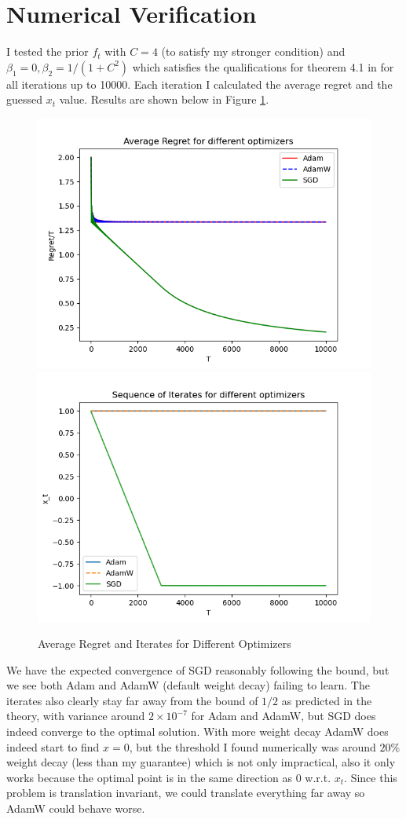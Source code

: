 \documentclass[landscape,twocolumn]{article}
\newcommand{\1}{\mathds{1}}
\begin{document}
\section{Numerical Verification}
I tested the prior \(f_t\) with \(C=4\) (to satisfy my stronger condition) and \(\beta_1=0,\beta_2 = 1/(1+C^2)\) which satisfies the qualifications for theorem 4.1 in \cite{kingma2017adam} for all iterations up to 10000. Each iteration I calculated the average regret and the guessed \(x_t\) value. Results are shown below in Figure \ref{fig:avg_regret}. 
\begin{figure}[H]
    \centering 
    \includegraphics[width=.49\linewidth]{../Notebooks/average_regret.png}
    \includegraphics[width=.49\linewidth]{../Notebooks/sequence_of_iterates.png}
    \caption{Average Regret and Iterates for Different Optimizers}
    \label{fig:avg_regret}
\end{figure}
We have the expected convergence of SGD reasonably following the bound, but we see both Adam and AdamW (default weight decay) failing to learn. The iterates also clearly stay far away from the bound of \(1/2\) as predicted in the theory, with variance around \(2\times 10^{-7}\) for Adam and AdamW, but SGD does indeed converge to the optimal solution. With more weight decay AdamW does indeed start to find \(x=0\), but the threshold I found numerically was around \(20\%\) weight decay (less than my guarantee) which is not only impractical, also it only works because the optimal point is in the same direction as 0 w.r.t. \(x_t\). Since this problem is translation invariant, we could translate everything far away so AdamW could behave worse. 
\printbibliography
\end{document}
